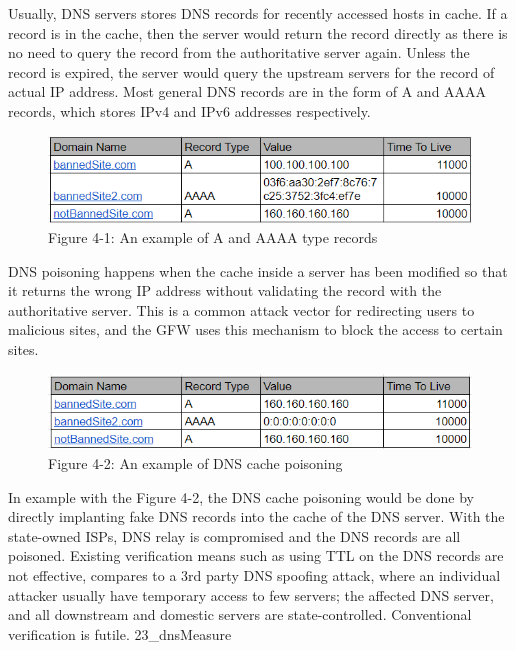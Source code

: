 \documentclass[sigconf]{acmart}
\begin{document}
Usually, DNS servers stores DNS records for recently accessed hosts in
cache. If a record is in the cache, then the server would return the
record directly as there is no need to query the record from the
authoritative server again. \cite{22_dnsConcpets} Unless the record is
expired, the server would query the upstream servers for the record of
actual IP address. Most general DNS records are in the form of A and
AAAA records, which stores IPv4 and IPv6 addresses respectively.

\begin{figure}
\centering
\includegraphics{res/4.1-DNS.png}
\caption{Figure 4-1: An example of A and AAAA type records}
\end{figure}

DNS poisoning happens when the cache inside a server has been modified
so that it returns the wrong IP address without validating the record
with the authoritative server. This is a common attack vector for
redirecting users to malicious sites, and the GFW uses this mechanism to
block the access to certain sites.

\begin{figure}
\centering
\includegraphics{res/4.2-DNS-poisoned.png}
\caption{Figure 4-2: An example of DNS cache poisoning}
\end{figure}

In example with the Figure 4-2, the DNS cache poisoning would be done by
directly implanting fake DNS records into the cache of the DNS server.
With the state-owned ISPs, DNS relay is compromised and the DNS records
are all poisoned. Existing verification means such as using TTL on the
DNS records are not effective, compares to a 3rd party DNS spoofing
attack, where an individual attacker usually have temporary access to
few servers; the affected DNS server, and all downstream and domestic
servers are state-controlled. Conventional verification is futile.
23\_dnsMeasure
\end{document}
